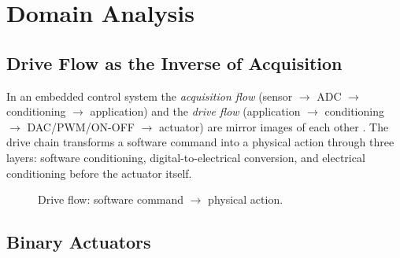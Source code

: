 \documentclass[12pt]{article}
\begin{document}
\section{Domain Analysis}

\subsection{Drive Flow as the Inverse of Acquisition}

In an embedded control system the \emph{acquisition flow} (sensor $\to$ ADC $\to$ conditioning $\to$ application) and the \emph{drive flow} (application $\to$ conditioning $\to$ DAC/PWM/ON-OFF $\to$ actuator) are mirror images of each other \cite{labbrief}. The drive chain transforms a software command into a physical action through three layers: software conditioning, digital-to-electrical conversion, and electrical conditioning before the actuator itself.

\begin{figure}[H]
\centering
{}
\caption{Drive flow: software command $\to$ physical action.}
\label{fig:driveflow}
\end{figure}

\subsection{Binary Actuators}
\end{document}

